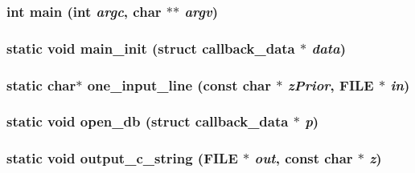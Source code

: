 \subsubsection{\setlength{\rightskip}{0pt plus 5cm}int main (int {\em argc}, char $\ast$$\ast$ {\em argv})}\label{shell_8c_24e6ce6d053864cf5fb7af941457bb0e}


\subsubsection{\setlength{\rightskip}{0pt plus 5cm}static void main\_\-init (struct \bf{callback\_\-data} $\ast$ {\em data})\hspace{0.3cm}{\tt  [static]}}\label{shell_8c_0f0662086c0356720ae4777f81fa24c7}


\subsubsection{\setlength{\rightskip}{0pt plus 5cm}static char$\ast$ one\_\-input\_\-line (const char $\ast$ {\em z\-Prior}, FILE $\ast$ {\em in})\hspace{0.3cm}{\tt  [static]}}\label{shell_8c_cf18abc4cb09bb69f835b1f946334b73}


\subsubsection{\setlength{\rightskip}{0pt plus 5cm}static void open\_\-db (struct \bf{callback\_\-data} $\ast$ {\em p})\hspace{0.3cm}{\tt  [static]}}\label{shell_8c_5b1f1627559f28c7921d4a94d44b94c7}


\subsubsection{\setlength{\rightskip}{0pt plus 5cm}static void output\_\-c\_\-string (FILE $\ast$ {\em out}, const char $\ast$ {\em z})\hspace{0.3cm}{\tt  [static]}}\label{shell_8c_98ff4b9c0f796c94638477a70d97f4d8}


